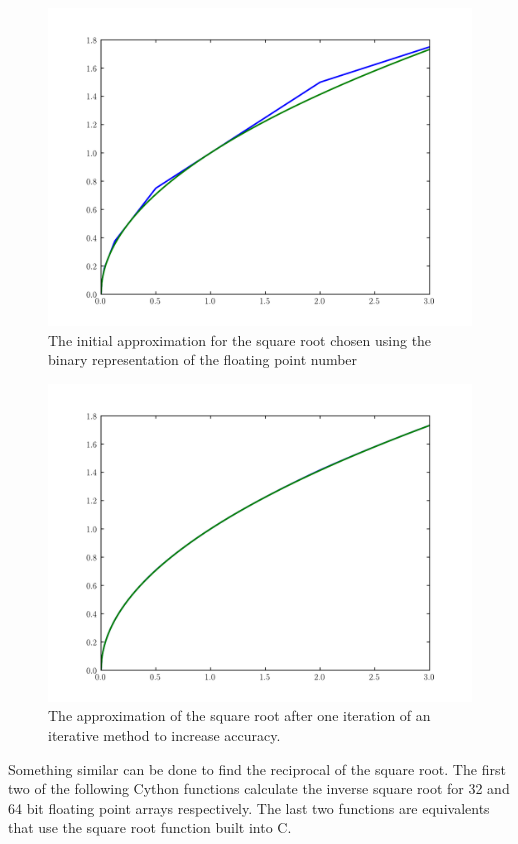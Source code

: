 \begin{figure}
\includegraphics[width=\textwidth]{sqrt0}
\caption{The initial approximation for the square root chosen using the binary representation of the floating point number}
\label{float:sqrtapprox0}
\end{figure}

\begin{figure}
\includegraphics[width=\textwidth]{sqrt1}
\caption{The approximation of the square root after one iteration of an iterative method to increase accuracy.}
\label{float:sqrtapprox1}
\end{figure}

Something similar can be done to find the reciprocal of the square root.
The first two of the following Cython functions calculate the inverse square root for 32 and 64 bit floating point arrays respectively.
The last two functions are equivalents that use the square root function built into C.

